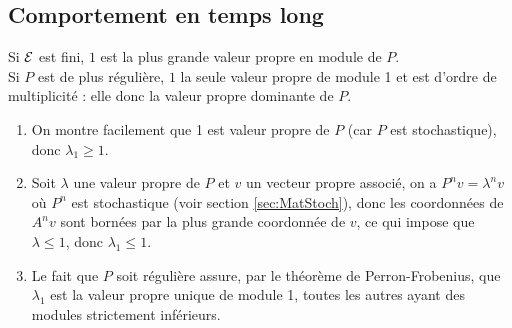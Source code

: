 % 
% 

\subsection{Comportement en temps long}  

\begin{proposition*}[Exercice 1.1.14+]
  Si $\mathcal{E}$ est fini, $1$ est la plus grande valeur propre en module de $P$. \\
  Si $P$ est de plus régulière, $1$ la seule valeur propre de module 1 et est d'ordre de multiplicité : elle donc la valeur propre dominante de $P$.
\end{proposition*}

\proof
\begin{enumerate}
 \item On montre facilement que 1 est valeur propre de $P$ (car $P$ est stochastique), donc $\lambda_1 \geq 1$.
 \item Soit $\lambda$ une valeur propre de $P$ et $v$ un vecteur propre associé, on a $P^n v = \lambda^n v$ où $P^n$ est stochastique (voir section \ref{sec:MatStoch}), donc les coordonnées de $A^n v$ sont bornées par la plus grande coordonnée de $v$, ce qui impose que $\lambda \leq 1$, donc $\lambda_1 \leq 1$.
 \item Le fait que $P$ soit régulière assure, par le théorème de Perron-Frobenius, que $\lambda_1$ est la valeur propre unique de module 1, toutes les autres ayant des modules strictement inférieurs. 
\end{enumerate}
\eproof

